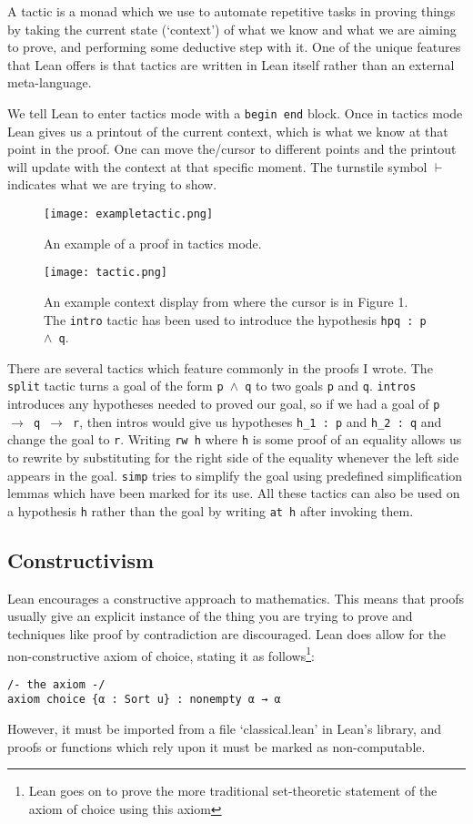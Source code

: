 \documentclass{article}
\newcommand{\ct}{\texttt}
\begin{document}
A tactic is a monad which we use to automate repetitive tasks in proving things by taking the current state (`context') of what we know and what we are aiming to prove, and performing some deductive step with it.
One of the unique features that Lean offers is that tactics are written in Lean itself rather than an external meta-language.

We tell Lean to enter tactics mode with a \ct{begin end} block.
Once in tactics mode Lean gives us a printout of the current context, which is what we know at that point in the proof. 
One can move the/cursor to different points and the printout will update with the context at that specific moment.
The turnstile symbol $\vdash$ indicates what we are trying to show.


\begin{figure}
    \center
    \texttt{[image: exampletactic.png]}
    \caption{An example of a proof in tactics mode.}
    \center
    \texttt{[image: tactic.png]}
    \caption{An example context display from where the cursor is in Figure 1. The \ct{intro} tactic has been used to introduce the hypothesis \ct{hpq : p $\land$ q}.}
\end{figure}

There are several tactics which feature commonly in the proofs I wrote.
The \ct{split} tactic turns a goal of the form \ct{p $\land$ q} to two goals \ct{p} and \ct{q}.
\ct{intros} introduces any hypotheses needed to proved our goal, so if we had a goal of \ct{p $\to$ q $\to$ r}, then intros would give us hypotheses \ct{h\_1 :  p} and \ct{h\_2 : q} and change the goal to \ct{r}.
Writing \ct{rw h} where \ct{h} is some proof of an equality allows us to rewrite by substituting for the right side of the equality whenever the left side appears in the goal.
\ct{simp} tries to simplify the goal using predefined simplification lemmas which have been marked for its use.
All these tactics can also be used on a hypothesis \ct{h} rather than the goal by writing \ct{at h} after invoking them.

\FloatBarrier
\subsection{Constructivism}
Lean encourages a constructive approach to mathematics. 
This means that proofs usually give an explicit instance of the thing you are trying to prove and techniques like proof by contradiction are discouraged.
Lean does allow for the non-constructive axiom of choice, stating it as follows\footnote{Lean goes on to prove the more traditional set-theoretic statement of the axiom of choice using this axiom}: 
\begin{lstlisting}
/- the axiom -/
axiom choice {α : Sort u} : nonempty α → α
\end{lstlisting}
However, it must be imported from a file `classical.lean' in Lean's library, and proofs or functions which rely upon it must be marked as non-computable.
\end{document}
